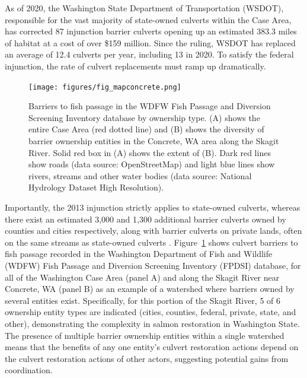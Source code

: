 As of 2020, the Washington State Department of Transportation (WSDOT), responsible for the vast majority of state-owned culverts within the Case Area, has corrected 87 injunction barrier culverts opening up an estimated 383.3 miles of habitat at a cost of over \$159 million. Since the ruling, WSDOT has replaced an average of 12.4 culverts per year, including 13 in 2020. To satisfy the federal injunction, the rate of culvert replacements must ramp up dramatically. 


\begin{figure}
\texttt{[image: figures/fig\_mapconcrete.png]}
\caption{Barriers to fish passage in the WDFW Fish Passage and Diversion Screening Inventory database by ownership type. (A) shows the entire Case Area (red dotted line) and (B) shows the diversity of barrier ownership entities in the Concrete, WA area along the Skagit River. Solid red box in (A) shows the extent of (B). Dark red lines show roads (data source: OpenStreetMap) and light blue lines show rivers, streams and other water bodies (data source: National Hydrology Dataset High Resolution).\label{fig:barrierMap}}
\end{figure}%

Importantly, the 2013 injunction strictly applies to state-owned culverts, whereas there exist an estimated 3,000 and 1,300 additional barrier culverts owned by counties and cities respectively, along with barrier culverts on private lands, often on the same streams as state-owned culverts \citep{brown_coming_2019}. Figure~\ref{fig:barrierMap} shows culvert barriers to fish passage recorded in the Washington Department of Fish and Wildlife (WDFW) Fish Passage and Diversion Screening Inventory (FPDSI) database, for all of the Washington Case Area (panel A) and along the Skagit River near Concrete, WA (panel B) as an example of a watershed where barriers owned by several entities exist. Specifically, for this portion of the Skagit River, 5 of 6 ownership entity types are indicated (cities, counties, federal, private, state, and other), demonstrating the complexity in salmon restoration in Washington State. The presence of multiple barrier ownership entities within a single watershed means that the benefits of any one entity's culvert restoration actions depend on the culvert restoration actions of other actors, suggesting potential gains from coordination. 

